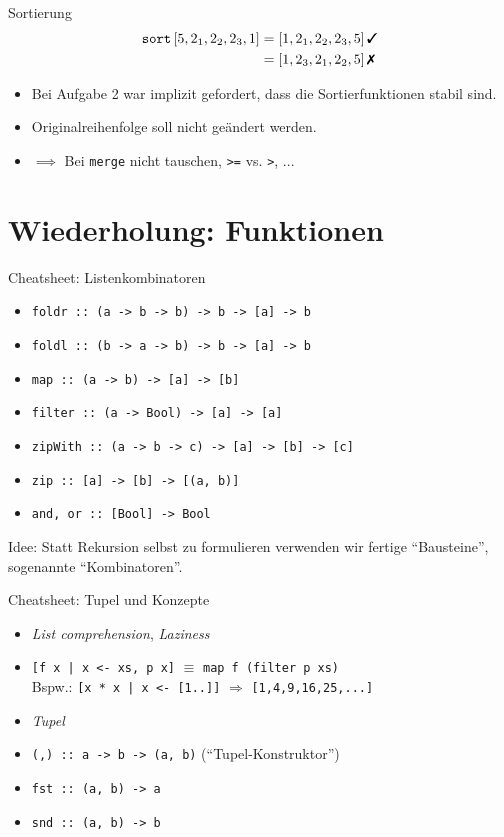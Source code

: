 \documentclass{beamer}
\begin{document}
\begin{frame}{Sortierung}
	\begin{align*}
		\texttt{sort} \left[ 5, 2_1, 2_2, 2_3, 1 \right]
		&= \left[ 1, 2_1, 2_2, 2_3, 5 \right] \text{\true} \\
		&= \left[ 1, 2_3, 2_1, 2_2, 5 \right] \text{\false}
	\end{align*}

	\begin{itemize}
		\item Bei Aufgabe 2 war implizit gefordert, dass die Sortierfunktionen stabil sind.
		\item Originalreihenfolge soll nicht geändert werden.
		\item $\implies$ Bei \texttt{merge} nicht tauschen, \texttt{>=} vs. \texttt{>}, ...
	\end{itemize}
\end{frame}

\section{Wiederholung: Funktionen}

\begin{frame}{Cheatsheet: Listenkombinatoren}
  \begin{itemize}
    \item \texttt{foldr :: (a -> b -> b) -> b -> [a] -> b}
    \item \texttt{foldl :: (b -> a -> b) -> b -> [a] -> b}
    \item \texttt{map :: (a -> b) -> [a] -> [b]}
    \item \texttt{filter :: (a -> Bool) -> [a] -> [a]}
    \item \texttt{zipWith :: (a -> b -> c) -> [a] -> [b] -> [c]}
    \item \texttt{zip :: [a] -> [b] -> [(a, b)]}
    \item \texttt{and, or :: [Bool] -> Bool}
  \end{itemize}

  Idee: Statt Rekursion selbst zu formulieren verwenden wir fertige \enquote{Bausteine}, sogenannte \enquote{Kombinatoren}.
\end{frame}

\begin{frame}{Cheatsheet: Tupel und Konzepte}
  \begin{itemize}
    \item \emph{List comprehension}, \emph{Laziness}
    \item \texttt{[f x | x <- xs, p x]} $\equiv$ \texttt{map f (filter p xs)}\\
      Bspw.: \texttt{[x * x | x <- [1..]]} $\Rightarrow$ \texttt{[1,4,9,16,25,...]}
    \item \emph{Tupel}
    \item \texttt{(,) :: a -> b -> (a, b)} (\enquote{Tupel-Konstruktor})
    \item \texttt{fst :: (a, b) -> a}
    \item \texttt{snd :: (a, b) -> b}
  \end{itemize}
\end{frame}
\end{document}
